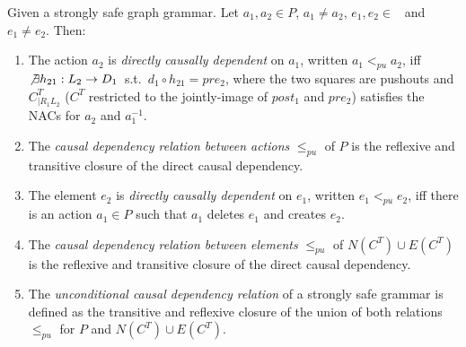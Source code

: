\begin{definition}\label{def:unconditional-causal-dependency} Given \doublyTypedGraphGrammarCore{} a strongly safe graph grammar. Let $a_1, a_2 \in P$, $a_1 \ne a_2$, \mbox{$e_1, e_2 \in $ \coreGraph{}} and $e_1 \ne e_2$. Then: 

  \begin{enumerate}
    \item The action $a_2$ is \emph{directly causally dependent} on $a_1$, written $a_1 <_{pu} a_2$, iff \mbox{$\not\exists h_{21} : L_2 \rightarrow D_1$ s.t. \mbox{$d_1 \circ h_{21} = pre_2$}}, where the two squares are pushouts and $C^T_{|R_1L_2}$ ($C^T$ restricted to the jointly-image of $post_1$ and $pre_2$) satisfies the NACs for $a_2$ and $a_1^{-1}$.


   \item The \emph{causal dependency relation between actions} $\leq_{pu}$ of $P$ is the reflexive and transitive closure of the direct causal dependency.
   \item The element $e_2$ is \emph{directly causally dependent} on $e_1$, written $e_1 <_{pu} e_2$, iff there is an action $a_1 \in P$ such that $a_1$ deletes $e_1$ and creates $e_2$.
   \item The \emph{causal dependency relation between elements} $\leq_{pu}$ of $N(C^T) \cup E(C^T)$ is the reflexive and transitive closure of the direct causal dependency.
   \item The \emph{unconditional causal dependency relation} of a strongly safe grammar is defined as the transitive and reflexive closure of the union of both relations $\leq_{pu}$ for $P$ and $N(C^T) \cup E(C^T)$.
  \end{enumerate}
\end{definition}


